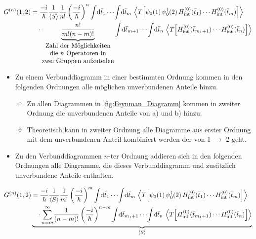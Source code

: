 \begin{equation}
  \begin{aligned}
    G^{(n)}(1,2)
     & = \frac{-i}{\hbar}\frac{1}{\erw{S}}\frac{1}{n!}\left(\frac{-i}{\hbar}\right)^n
    \int\!\mathrm{d}\bar{t}_1\cdots\!\int\!\mathrm{d}\bar{t}_m\,
    \erw{T\!\left[\psi_0(1)\,\psi_0^\dagger(2)\,H^{(0)}_{\text{int}}(\bar{t}_1)\cdots H^{(0)}_{\text{int}}(\bar{t}_m)\right]} \\
     & \quad\cdot
    \underbrace{\frac{n!}{m!(n-m)!}}_{\shortstack{Zahl der Möglichkeiten\\die $n$ Operatoren in \\zwei Gruppen aufzuteilen}}
    \int\!\mathrm{d}\bar{t}_{m+1}\cdots\!\int\!\mathrm{d}\bar{t}_n\,
    \erw{T\!\left[H^{(0)}_{\text{int}}(\bar{t}_{m_1+1})\cdots H^{(0)}_{\text{int}}(\bar{t}_n)\right]}
  \end{aligned}
\end{equation}

\begin{itemize}
  \item Zu einem Verbunddiagramm in einer bestimmten Ordnung kommen in den folgenden Ordnungen alle möglichen unverbundenen Anteile hinzu.
        \begin{itemize}
          \item Zu allen Diagrammen in \autoref{fig:Feynman_Diagramm} kommen in zweiter Ordnung die unverbundenen Anteile von a) und b) hinzu.
          \item Theoretisch kann in zweiter Ordnung alle Diagramme aus erster Ordnung mit dem unverbundenen Anteil kombiniert werden der von 1 $\to$ 2 geht.
        \end{itemize}
  \item Zu den Verbunddiagrammen $n$-ter Ordnung addieren sich in den folgenden Ordnungen alle Diagramme, die dieses Verbunddiagramm und zusätzlich unverbundene Anteile enthalten.
\end{itemize}

\begin{equation}
  \begin{aligned}
    G^{(n)}(1,2)
     & = \frac{-i}{\hbar}\frac{1}{\erw{S}}\frac{1}{m!}\left(\frac{-i}{\hbar}\right)^m
    \int\!\mathrm{d}\bar{t}_1\cdots\!\int\!\mathrm{d}\bar{t}_m\,
    \erw{T\!\left[\psi_0(1)\,\psi_0^\dagger(2)\,H^{(0)}_{\text{int}}(\bar{t}_1)\cdots H^{(0)}_{\text{int}}(\bar{t}_m)\right]}   \\
     & \underbrace{\quad\cdot \sum\limits_{n=m}^{\infty}\!
         \frac{1}{(n-m)!} \left(\frac{-i}{\hbar}\right)^{n-m} \int\!\mathrm{d}\bar{t}_{m_1+1}\cdots\!\int\!\mathrm{d}\bar{t}_n\,
         \erw{T\!\left[H^{(0)}_{\text{int}}(\bar{t}_{m_1+1})\cdots H^{(0)}_{\text{int}}(\bar{t}_n)\right]}}_{\erw{S}}
  \end{aligned}
\end{equation}

